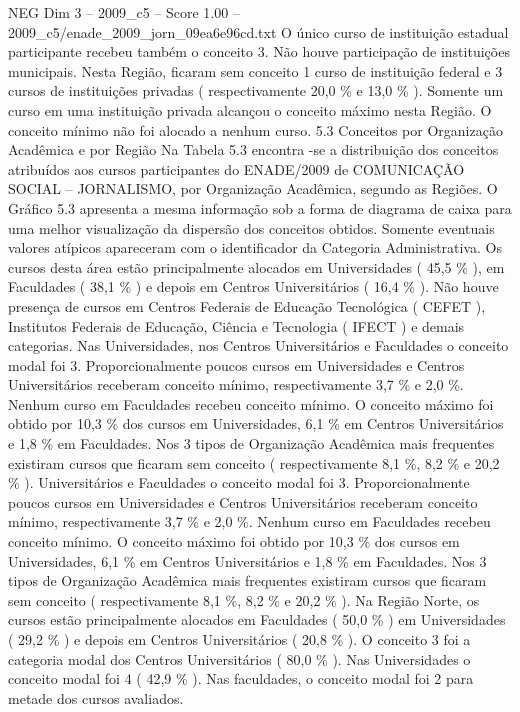 \begin{textsample}{NEG Dim 3 – 2009\_c5 – Score 1.00 – 2009\_c5/enade\_2009\_jorn\_09ea6e96cd.txt}
O único curso de instituição estadual participante recebeu também o conceito 3.
Não houve participação de instituições municipais.
Nesta Região, ficaram sem conceito 1 curso de instituição federal e 3 cursos de instituições privadas ( respectivamente 20,0 \% e 13,0 \% ).
Somente um curso em uma instituição privada alcançou o conceito máximo nesta Região.
O conceito mínimo não foi alocado a nenhum curso. 5.3 Conceitos por Organização Acadêmica e por Região Na Tabela 5.3 encontra -se a distribuição dos conceitos atribuídos aos cursos participantes do ENADE/2009 de COMUNICAÇÃO SOCIAL – JORNALISMO, por Organização Acadêmica, segundo as Regiões.
O Gráfico 5.3 apresenta a mesma informação sob a forma de diagrama de caixa para uma melhor visualização da dispersão dos conceitos obtidos.
Somente eventuais valores atípicos apareceram com o identificador da Categoria Administrativa.
Os cursos desta área estão principalmente alocados em Universidades ( 45,5 \% ), em Faculdades ( 38,1 \% ) e depois em Centros Universitários ( 16,4 \% ).
Não houve presença de cursos em Centros Federais de Educação Tecnológica ( CEFET ), Institutos Federais de Educação, Ciência e Tecnologia ( IFECT ) e demais categorias.
Nas Universidades, nos Centros Universitários e Faculdades o conceito modal foi 3.
Proporcionalmente poucos cursos em Universidades e Centros Universitários receberam conceito mínimo, respectivamente 3,7 \% e 2,0 \%.
Nenhum curso em Faculdades recebeu conceito mínimo.
O conceito máximo foi obtido por 10,3 \% dos cursos em Universidades, 6,1 \% em Centros Universitários e 1,8 \% em Faculdades.
Nos 3 tipos de Organização Acadêmica mais frequentes existiram cursos que ficaram sem conceito ( respectivamente 8,1 \%, 8,2 \% e 20,2 \% ).
Universitários e Faculdades o conceito modal foi 3.
Proporcionalmente poucos cursos em Universidades e Centros Universitários receberam conceito mínimo, respectivamente 3,7 \% e 2,0 \%.
Nenhum curso em Faculdades recebeu conceito mínimo.
O conceito máximo foi obtido por 10,3 \% dos cursos em Universidades, 6,1 \% em Centros Universitários e 1,8 \% em Faculdades.
Nos 3 tipos de Organização Acadêmica mais frequentes existiram cursos que ficaram sem conceito ( respectivamente 8,1 \%, 8,2 \% e 20,2 \% ).
Na Região Norte, os cursos estão principalmente alocados em Faculdades ( 50,0 \% ) em Universidades ( 29,2 \% ) e depois em Centros Universitários ( 20,8 \% ).
O conceito 3 foi a categoria modal dos Centros Universitários ( 80,0 \% ).
Nas Universidades o conceito modal foi 4 ( 42,9 \% ).
Nas faculdades, o conceito modal foi 2 para metade dos cursos avaliados.

\end{textsample}
